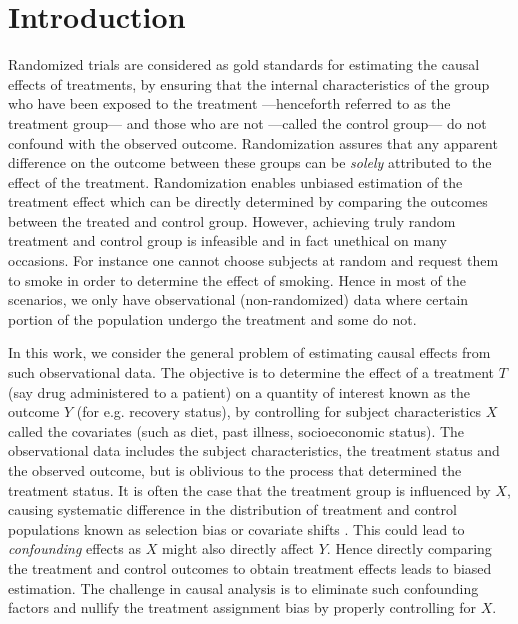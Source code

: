 \documentclass[sigconf]{acmart}
\newcommand{\eat}[1]{}
\theoremstyle{plain}
\numberwithin{equation}{section}
\begin{document}
\section{Introduction}\label{sec:introduction}
Randomized trials are considered as gold standards for estimating the causal effects of treatments, by ensuring that the internal characteristics of the group who have been exposed to the treatment ---henceforth referred to as the treatment group--- and those who are not ---called the control group--- do not confound with the observed outcome. Randomization assures that any apparent difference on the outcome between these groups can be \emph{solely} attributed to the effect of the treatment. Randomization enables unbiased estimation of the treatment effect which can be directly determined by comparing the outcomes between the treated and control group. However, achieving truly random treatment and control group is infeasible and in fact unethical on many occasions. For instance one cannot choose subjects at random and request them to smoke in order to determine the effect of smoking. Hence in most of the scenarios, we only have observational (non-randomized) data where certain portion of the population undergo the treatment and some do not. 

In this work, we consider the general problem of estimating causal effects from such observational data. The objective is to determine the effect of a treatment $T$ (say drug administered to a patient) on a quantity of interest known as the outcome $Y$ (for e.g. recovery status), by controlling for subject characteristics $X$ called the covariates (such as diet, past illness, socioeconomic status). The observational data includes the subject characteristics, the treatment status and the observed outcome, but is oblivious to the process that determined the treatment status. It is often the case that the treatment group is influenced by $X$, causing systematic difference in the distribution of treatment and control populations known as selection bias or covariate shifts \cite{learningRepresentations, covariateShiftScholkopf, covariateShiftMIT}. This could lead to \emph{confounding} effects as $X$ might also directly affect $Y$.\eat{: for instance, rich people  in generally better health condition are able to afford certain medications.} Hence directly comparing the treatment and control outcomes to obtain treatment effects leads to biased estimation. The challenge in causal analysis is to eliminate such confounding factors and nullify the treatment assignment bias by properly controlling for $X$.
\end{document}

